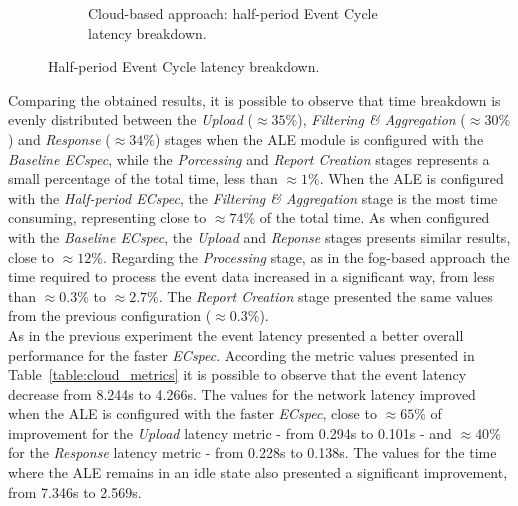 \begin{figure}[ht!]
\begin{subfigure}{.5\textwidth}
    \caption{Cloud-based approach: half-period Event Cycle\\ latency breakdown.}
    \label{fig:ecspecf_effective_half}
  \end{subfigure}
  \caption{Half-period Event Cycle latency breakdown.}
  \label{fig:ecspecf_effective_breakdown}
\end{figure}

Comparing the obtained results, it is possible to observe that time breakdown is evenly distributed
between the \textit{Upload} ($\approx35\%$), \textit{Filtering \& Aggregation} ($\approx30\%$) and
\textit{Response} ($\approx34\%$) stages when the \gls{ALE} module is configured with the \textit{Baseline ECspec},
while the \textit{Porcessing} and \textit{Report Creation} stages represents a small percentage of the
total time, less than $\approx1\%$. When the \gls{ALE} is configured with the \textit{Half-period ECspec},
the \textit{Filtering \& Aggregation} stage is the most time consuming, representing close to $\approx 74\%$
of the total time. As when configured with the \textit{Baseline ECspec}, the \textit{Upload} and
\textit{Reponse} stages presents similar results, close to $\approx12\%$. Regarding the \textit{Processing}
stage, as in the fog-based approach the time required to process the event data increased in a significant
way, from less than $\approx0.3\%$ to $\approx2.7\%$. The \textit{Report Creation} stage presented the
same values from the previous configuration ($\approx0.3\%$).\\

As in the previous experiment the event latency presented a better overall performance for the faster \textit{ECspec}.
According the metric values presented in Table~\ref{table:cloud_metrics} it is possible to observe that the event
latency decrease from 8.244s to 4.266s. The values for the network latency improved when the \gls{ALE} is
configured with the faster \textit{ECspec}, close to $\approx65\%$ of improvement for the \textit{Upload}
latency metric - from 0.294s to 0.101s - and $\approx40\%$ for the \textit{Response} latency metric -
from 0.228s to 0.138s. The values for the time where the \gls{ALE} remains in an idle state also presented
a significant improvement, from 7.346s to 2.569s.\\

